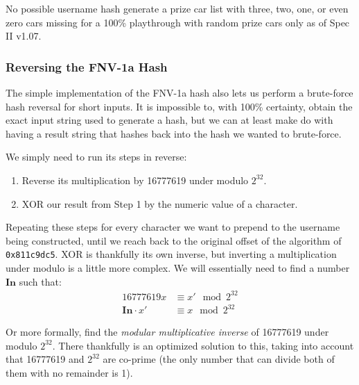 \documentclass[14pt,a4paper,notitlepage]{extarticle}
\begin{document}
                No possible username hash generate a prize car list with three, two, one,
                or even zero cars missing for a 100\% playthrough with random prize cars only
                as of Spec II v1.07.

            \subsubsection*{Reversing the FNV-1a Hash}
                The simple implementation of the FNV-1a hash also lets us perform a brute-force hash
                reversal for short inputs. It is impossible to, with 100\% certainty, obtain the exact
                input string used to generate a hash, but we can at least make do with having a result
                string that hashes back into the hash we wanted to brute-force.

                We simply need to run its steps in reverse:

                \begin{enumerate}
                    \item Reverse its multiplication by 16777619 under modulo $2^{32}$.
                    \item XOR our result from Step 1 by the numeric value of a character.
                \end{enumerate}

                Repeating these steps for every character we want to prepend to the
                username being constructed, until we reach back to the original offset
                of the algorithm of \texttt{0x811c9dc5}.
                XOR is thankfully its own inverse, but
                inverting a multiplication under modulo is a little more complex.
                We will essentially need to find a number $\mathbf{In}$ such that:
                \begin{align*}
                    16777619x &\equiv x' \mod 2^{32}\\
                    \mathbf{In} \cdot x' &\equiv x \mod 2^{32}
                \end{align*}

                Or more formally, find the \textit{modular multiplicative inverse} of
                16777619 under modulo $2^{32}$. There thankfully is an optimized solution
                to this, taking into account that 16777619 and $2^{32}$ are co-prime
                (the only number that can divide both of them with no remainder is 1).
\end{document}

